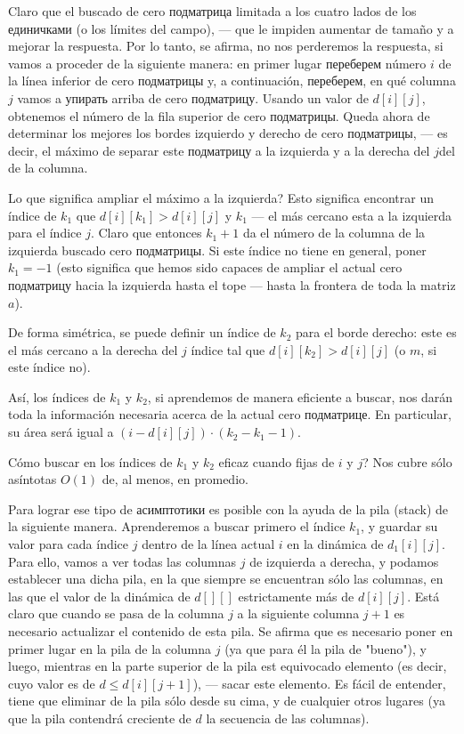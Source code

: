 Claro que el buscado de cero подматрица limitada a los cuatro lados de los единичками (o los límites del campo), --- que le impiden aumentar de tamaño y a mejorar la respuesta. Por lo tanto, se afirma, no nos perderemos la respuesta, si vamos a proceder de la siguiente manera: en primer lugar переберем número $i$ de la línea inferior de cero подматрицы y, a continuación, переберем, en qué columna $j$ vamos a упирать arriba de cero подматрицу. Usando un valor de $d[i][j]$, obtenemos el número de la fila superior de cero подматрицы. Queda ahora de determinar los mejores los bordes izquierdo y derecho de cero подматрицы, --- es decir, el máximo de separar este подматрицу a la izquierda y a la derecha del $j$del de la columna.

Lo que significa ampliar el máximo a la izquierda? Esto significa encontrar un índice de $k_1$ que $d[i][k_1] > d[i][j]$ y $k_1$ --- el más cercano esta a la izquierda para el índice $j$. Claro que entonces $k_1+1$ da el número de la columna de la izquierda buscado cero подматрицы. Si este índice no tiene en general, poner $k_1=-1$ (esto significa que hemos sido capaces de ampliar el actual cero подматрицу hacia la izquierda hasta el tope --- hasta la frontera de toda la matriz $a$).

De forma simétrica, se puede definir un índice de $k_2$ para el borde derecho: este es el más cercano a la derecha del $j$ índice tal que $d[i][k_2] > d[i][j]$ (o $m$, si este índice no).

Así, los índices de $k_1$ y $k_2$, si aprendemos de manera eficiente a buscar, nos darán toda la información necesaria acerca de la actual cero подматрице. En particular, su área será igual a $(i - d[i][j]) \cdot (k_2 - k_1 - 1)$.

Cómo buscar en los índices de $k_1$ y $k_2$ eficaz cuando fijas de $i$ y $j$? Nos cubre sólo asíntotas $O(1)$ de, al menos, en promedio.

Para lograr ese tipo de асимптотики es posible con la ayuda de la pila (stack) de la siguiente manera. Aprenderemos a buscar primero el índice $k_1$, y guardar su valor para cada índice $j$ dentro de la línea actual $i$ en la dinámica de $d_1[i][j]$. Para ello, vamos a ver todas las columnas $j$ de izquierda a derecha, y podamos establecer una dicha pila, en la que siempre se encuentran sólo las columnas, en las que el valor de la dinámica de $d[][]$ estrictamente más de $d[i][j]$. Está claro que cuando se pasa de la columna $j$ a la siguiente columna $j+1$ es necesario actualizar el contenido de esta pila. Se afirma que es necesario poner en primer lugar en la pila de la columna $j$ (ya que para él la pila de "bueno"), y luego, mientras en la parte superior de la pila est equivocado elemento (es decir, cuyo valor es de $d \le d[i][j+1]$), --- sacar este elemento. Es fácil de entender, tiene que eliminar de la pila sólo desde su cima, y de cualquier otros lugares (ya que la pila contendrá creciente de $d$ la secuencia de las columnas).


